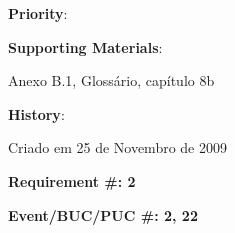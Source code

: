 \begin{description}
\item \textbf{Priority}:\\

\item \textbf{Supporting Materials}:

Anexo B.1, Glossário, capítulo 8b\\

\item \textbf{History}:

Criado em 25 de Novembro de 2009\\

\end{description}

\pagebreak

\begin{minipage}{0.55\textwidth}
\begin{flushleft}\textbf{Requirement \#: 2}\end{flushleft}
\end{minipage}
\begin{minipage}{0.4\textwidth}
\begin{flushright}\textbf{Event/BUC/PUC \#: 2, 22}\end{flushright}
\end{minipage}

